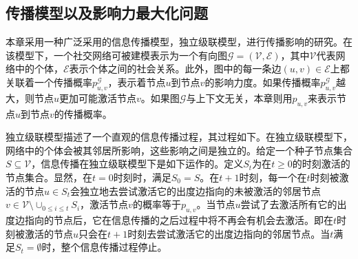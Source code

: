 \subsection{传播模型以及影响力最大化问题}
\label{3subsec:model}
本章采用一种广泛采用的信息传播模型，独立级联模型，进行传播影响的研究。在该模型下，一个社交网络可被建模表示为一个有向图$\mathcal{G}=\left(\mathcal{V},\mathcal{E}\right)$，其中$\mathcal{V}$代表网络中的个体，$\mathcal{E}$表示个体之间的社会关系。此外，图中的每一条边$\left(u, v\right) \in \mathcal{E}$上都关联着一个传播概率$p^\mathcal{G}_{u,v}$，表示着节点$u$到节点$v$的影响力度。如果传播概率$p^\mathcal{G}_{u,v}$越大，则节点$u$更加可能激活节点$v$。如果图$\mathcal{G}$与上下文无关，本章则用$p_{u,v}$来表示节点$u$到节点$v$的传播概率。

独立级联模型描述了一个直观的信息传播过程，其过程如下。在独立级联模型下，网络中的个体会被其邻居所影响，这些影响之间是独立的。给定一个种子节点集合$S \subseteq \mathcal{V}$，信息传播在独立级联模型下是如下运作的。定义$S_t$为在$t \geq 0$的时刻激活的节点集合。显然，在$t=0$时刻时，满足$S_0=S$。在$t+1$时刻，每一个在$t$时刻被激活的节点$u \in S_t$会独立地去尝试激活它的出度边指向的未被激活的邻居节点$v \in \mathcal{V} \setminus \cup_{0 \leq i \leq t}S_i$，激活节点$v$的概率等于$p_{u,v}$。当节点$u$尝试了去激活所有它的出度边指向的节点后，它在信息传播的之后过程中将不再会有机会去激活。即在$t$时刻被激活的节点$u$只会在$t+1$时刻去尝试激活它的出度边指向的邻居节点。当$t$满足$S_t = \emptyset$时，整个信息传播过程停止。

